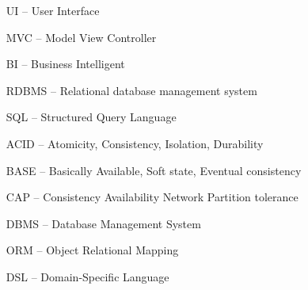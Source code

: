 \begin{itemize}[leftmargin=2cm, topsep=0pt, partopsep=5pt,itemsep=0pt,parsep=0pt]
\item[UI --] User Interface
\item[MVC --] Model View Controller
\item[BI --] Business Intelligent
\item[RDBMS --] Relational database management system
\item[SQL --] Structured Query Language
\item[ACID --] Atomicity, Consistency, Isolation, Durability
\item[BASE --] Basically Available, Soft state, Eventual consistency
\item[CAP --] Consistency Availability Network Partition tolerance
\item[DBMS --] Database Management System
\item[ORM --] Object Relational Mapping
\item[DSL --] Domain-Specific Language
\end{itemize}